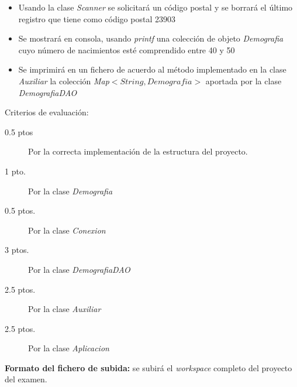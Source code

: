 \documentclass[addpoints,12pt]{exam}
\begin{document}
\begin{questions}
\begin{description}
\begin{itemize}
\item Usando la clase \emph{Scanner} se solicitará un código postal y se borrará el último registro que tiene como código postal 23903
\item Se mostrará en consola, usando \emph{printf} una colección de objeto \emph{Demografia} cuyo número de nacimientos esté comprendido entre 40 y 50
\item Se imprimirá en un fichero de acuerdo al método implementado en la clase \emph{Auxiliar} la colección \emph{Map$<String,Demografia>$} aportada por la clase \emph{\emph{DemografiaDAO}}
\end{itemize}
\end{description}
Criterios de evaluación:
\begin{description}
\item[0.5 ptos] Por la correcta implementación de la estructura del proyecto.
\item[1 pto.] Por la clase \emph{Demografia}
\item[0.5 ptos.] Por la clase \emph{Conexion}
\item[3 ptos.] Por la clase \emph{DemografiaDAO}
\item[2.5 ptos.] Por la clase \emph{Auxiliar}
\item[2.5 ptos.] Por la clase \emph{Aplicacion}
\end{description}
\textbf{Formato del fichero de subida:} se subirá el \emph{workspace} completo del proyecto del examen.
\end{questions}
\end{document}
